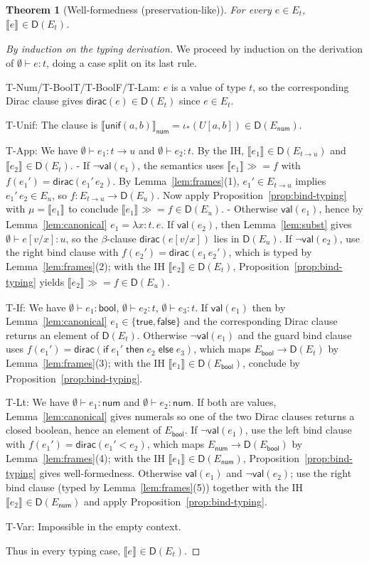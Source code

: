 \documentclass[11pt]{article}
\newtheorem{theorem}{Theorem}
\newcommand{\D}{\mathsf{D}}
\newcommand{\dirac}{\mathsf{dirac}}
\newcommand{\bind}{\mathbin{\gg\!=}}
\newcommand{\sem}[2][]{\llbracket #2 \rrbracket_{#1}}
\newcommand{\E}[1]{E_{#1}}
\newcommand{\ty}[1]{\mathsf{#1}}
\newcommand{\bool}{\ty{bool}}
\newcommand{\num}{\ty{num}}
\newcommand{\arr}{\rightarrow}
\newcommand{\val}{\mathsf{val}}
\begin{document}
\begin{theorem}[Well-formedness (preservation-like)]\label{thm:pres}
For every $e\in \E{t}$, $\sem{e}\in \D(\E{t})$.
\end{theorem}
\begin{proof}[By induction on the typing derivation]
We proceed by induction on the derivation of $\emptyset\vdash e:t$, doing a case split on its last rule.

T-Num/T-BoolT/T-BoolF/T-Lam: $e$ is a value of type $t$, so the corresponding Dirac clause gives $\dirac(e)\in \D(\E{t})$ since $e\in \E{t}$.

T-Unif: The clause is $\sem[\num]{\ty{unif}(a,b)}=\iota_{*}(U[a,b])\in \D(\E{\num})$.

T-App: We have $\emptyset\vdash e_1:t\arr u$ and $\emptyset\vdash e_2:t$. By the IH, $\sem{e_1}\in\D(\E{t\arr u})$ and $\sem{e_2}\in\D(\E{t})$.
- If $\neg\val(e_1)$, the semantics uses $\sem{e_1}\bind f$ with $f(e_1')=\dirac(e_1'\,e_2)$. By Lemma~\ref{lem:frames}(1), $e_1'\in\E{t\arr u}$ implies $e_1'\,e_2\in\E{u}$, so $f:\E{t\arr u}\to \D(\E{u})$. Now apply Proposition~\ref{prop:bind-typing} with $\mu=\sem{e_1}$ to conclude $\sem{e_1}\bind f\in \D(\E{u})$.
- Otherwise $\val(e_1)$, hence by Lemma~\ref{lem:canonical} $e_1=\lambda x{:}t.\,e$. If $\val(e_2)$, then Lemma~\ref{lem:subst} gives $\emptyset\vdash e[v/x]:u$, so the $\beta$-clause $\dirac(e[v/x])$ lies in $\D(\E{u})$. If $\neg\val(e_2)$, use the right bind clause with $f(e_2')=\dirac(e_1\,e_2')$, which is typed by Lemma~\ref{lem:frames}(2); with the IH $\sem{e_2}\in\D(\E{t})$, Proposition~\ref{prop:bind-typing} yields $\sem{e_2}\bind f\in \D(\E{u})$.

T-If: We have $\emptyset\vdash e_1:\bool$, $\emptyset\vdash e_2:t$, $\emptyset\vdash e_3:t$. If $\val(e_1)$ then by Lemma~\ref{lem:canonical} $e_1\in\{\ty{true},\ty{false}\}$ and the corresponding Dirac clause returns an element of $\D(\E{t})$. Otherwise $\neg\val(e_1)$ and the guard bind clause uses $f(e_1')=\dirac(\ty{if}\;e_1'\;\ty{then}\;e_2\;\ty{else}\;e_3)$, which maps $\E{\bool}\to \D(\E{t})$ by Lemma~\ref{lem:frames}(3); with the IH $\sem{e_1}\in\D(\E{\bool})$, conclude by Proposition~\ref{prop:bind-typing}.

T-Lt: We have $\emptyset\vdash e_1:\num$ and $\emptyset\vdash e_2:\num$. If both are values, Lemma~\ref{lem:canonical} gives numerals so one of the two Dirac clauses returns a closed boolean, hence an element of $\E{\bool}$. If $\neg\val(e_1)$, use the left bind clause with $f(e_1')=\dirac(e_1'{<}e_2)$, which maps $\E{\num}\to \D(\E{\bool})$ by Lemma~\ref{lem:frames}(4); with the IH $\sem{e_1}\in\D(\E{\num})$, Proposition~\ref{prop:bind-typing} gives well-formedness. Otherwise $\val(e_1)$ and $\neg\val(e_2)$; use the right bind clause (typed by Lemma~\ref{lem:frames}(5)) together with the IH $\sem{e_2}\in\D(\E{\num})$ and apply Proposition~\ref{prop:bind-typing}.

T-Var: Impossible in the empty context.

Thus in every typing case, $\sem{e}\in \D(\E{t})$.
\end{proof}
\end{document}
